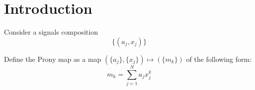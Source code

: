 \section{Introduction}
Consider a signals composition
$$
\{ (a_j, x_j) \}
$$

Define the Prony map as a map $(\{a_j\}, \{x_j\}) \mapsto (\{m_k\})$ of the following form:
$$
m_k = \sum_{j=1}^N a_j x_j^k
$$
  
  
  
  
  
  